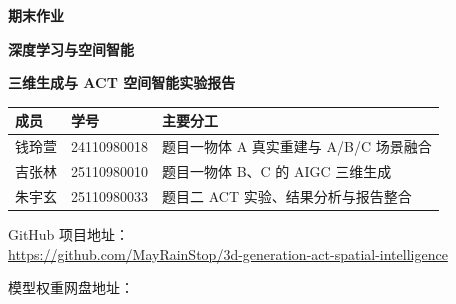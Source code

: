 \documentclass[UTF8,a4paper,11pt]{ctexart}
\begin{document}
\begin{center}
    {\bfseries 期末作业\par}
    \vspace{0.5em}
    {\bfseries 深度学习与空间智能\par}
    \vspace{1.0em}
    {\bfseries 三维生成与 ACT 空间智能实验报告\par}
    \vspace{0.6em}
    \small
    \begin{tabular}{lll}
        \toprule
        成员 & 学号 & 主要分工 \\
        \midrule
        钱玲萱 & 24110980018 & 题目一物体 A 真实重建与 A/B/C 场景融合 \\
        吉张林 & 25110980010 & 题目一物体 B、C 的 AIGC 三维生成 \\
        朱宇玄 & 25110980033 & 题目二 ACT 实验、结果分析与报告整合 \\
        \bottomrule
    \end{tabular}
\end{center}

\vspace{0.6em}

\begin{center}
    \small
    GitHub 项目地址：\\[-0.1em]
    \url{https://github.com/MayRainStop/3d-generation-act-spatial-intelligence}

    模型权重网盘地址：\\[-0.1em]
\end{center}

\vspace{0.6em}
\end{document}
